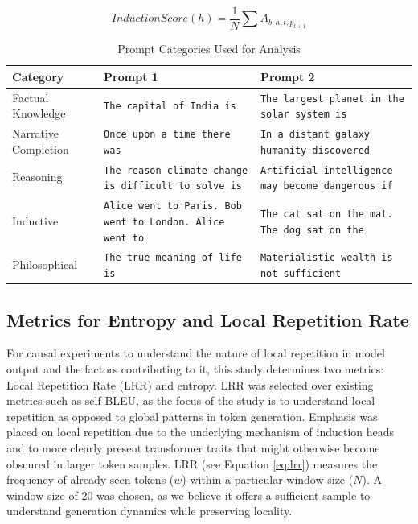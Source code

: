 \documentclass[twocolumn]{article}
\begin{document}
\begin{equation}
    InductionScore(h) = \frac{1}{N}\sum A_{b,h,t,p_{t+1}}
    \label{eq:inductionscore}
\end{equation}

\begin{table}[t!]
\centering
\footnotesize
\renewcommand{\arraystretch}{1.15}
\setlength{\tabcolsep}{4pt}
\setlength{\abovecaptionskip}{0.25em}
\setlength{\belowcaptionskip}{0.4em}


\begin{tabular}{p{3cm} p{5.5cm} p{5.5cm}}
\toprule
\textbf{Category} & \textbf{Prompt 1} & \textbf{Prompt 2} \\
\midrule

Factual Knowledge &
\texttt{The capital of India is} &
\texttt{The largest planet in the solar system is}
\\[0.35em]

Narrative Completion &
\texttt{Once upon a time there was} &
\texttt{In a distant galaxy humanity discovered}
\\[0.35em]

Reasoning &
\texttt{The reason climate change is difficult to solve is} &
\texttt{Artificial intelligence may become dangerous if}
\\[0.35em]

Inductive &
\texttt{Alice went to Paris. Bob went to London. Alice went to} &
\texttt{The cat sat on the mat. The dog sat on the}
\\[0.35em]

Philosophical &
\texttt{The true meaning of life is} &
\texttt{Materialistic wealth is not sufficient}
\\

\bottomrule
\end{tabular}
\caption{Prompt Categories Used for Analysis}
\label{tab:prompt_categories}
\end{table}

\subsection{Metrics for Entropy and Local Repetition Rate}

For causal experiments to understand the nature of local repetition in model output and the factors contributing to it, this study determines two metrics: Local Repetition Rate (LRR) and entropy. LRR was selected over existing metrics such as self-BLEU, as the focus of the study is to understand local repetition as opposed to global patterns in token generation. Emphasis was placed on local repetition due to the underlying mechanism of induction heads and to more clearly present transformer traits that might otherwise become obscured in larger token samples. LRR (see Equation \ref{eq:lrr}) measures the frequency of already seen tokens ($w$) within a particular window size ($N$). A window size of 20 was chosen, as we believe it offers a sufficient sample to understand generation dynamics while preserving locality.  
\end{document}
